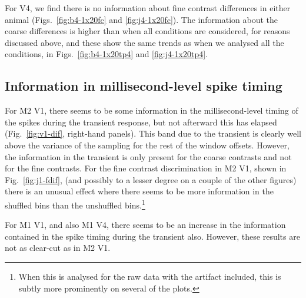 For \ac{V4}, we find there is no information about fine contrast differences in either animal (Figs.~\ref{fig:b4-1x20fc} and \ref{fig:j4-1x20fc}).
The information about the coarse differences is higher than when all conditions are considered, for reasons discussed above, and these show the same trends as when we analysed all the conditions, in Figs.~\ref{fig:b4-1x20tp4} and \ref{fig:j4-1x20tp4}.

\FloatBarrier
\subsection{Information in millisecond-level spike timing}

For \ac{M2} \ac{V1}, there seems to be some information in the millisecond-level timing of the spikes during the transient response, but not afterward this has elapsed (Fig.~\ref{fig:v1-dif}, right-hand panels).
This band due to the transient is clearly well above the variance of the sampling for the rest of the window offsets.
However, the information in the transient is only present for the coarse contrasts and not for the fine contrasts.
For the fine contrast discrimination in \ac{M2} \ac{V1}, shown in Fig.~\ref{fig:j1-fdif}, (and possibly to a lesser degree on a couple of the other figures) there is an unusual effect where there seems to be more information in the shuffled bins than the unshuffled bins.\footnote{When this is analysed for the raw data with the artifact included, this is subtly more prominently on several of the plots.}

For \ac{M1} \ac{V1}, and also \ac{M1} \ac{V4}, there seems to be an increase in the information contained in the spike timing during the transient also.
However, these results are not as clear-cut as in \ac{M2} \ac{V1}.

% 

